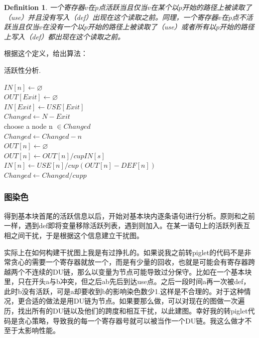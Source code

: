 \documentclass[10pt,a4paper]{article}
\newtheorem{mydef}{Definition}
\begin{document}
\begin{mydef}
    一个寄存器$v$在$p$点活跃当且仅当$v$在某个以$p$开始的路径上被读取了（use）并且没有写入（def）出现在这个读取之前。同理，一个寄存器$v$在$p$点不活跃当且仅当$v$在没有一个以$p$开始的路径上被读取了（use）或者所有以$p$开始的路径上写入（def）都出现在这个读取之前。
\end{mydef}

根据这个定义，给出算法：

\begin{algorithm}
\small
    \caption{活跃性分析. }
    \SetAlgoLined
    \SetAlgoLined
       {
          $IN[n] \leftarrow \varnothing $\\
      }
      $OUT[Exit] \leftarrow \varnothing$\\
      $IN[Exit] \leftarrow USE[Exit]$\\
      $Changed \leftarrow N - {Exit}$\\
      {
      		choose a node n $ \in Changed$ \\
			$Changed \leftarrow Changed - {n}$ \\
			$OUT[n] \leftarrow \varnothing$\\
			 {
          		$OUT[n] \leftarrow OUT[n] /cup IN[s]$\\
      		}
			$IN[n] \leftarrow USE[n] /cup (OUT[n] - DEF[n]) $\\
			{
				 {
          			$Changed \leftarrow Changed /cup {p}$\\
      			}
			}
	  }
    \label{tab:algorithm}
\end{algorithm}

\subsubsection{图染色}

得到基本块首尾的活跃信息以后，开始对基本块内逐条语句进行分析。原则和之前一样，遇到def即将变量移除活跃列表，遇到则加入。在某一语句上的活跃列表互相之间干扰，于是根据这个信息建立干扰图。

实际上在如何构建干扰图上我是有过挣扎的。如果说我之前转piglet的代码不是非常贪心的需要一个寄存器就放一个，而是有少量的回收，也就是可能会有寄存器跨越两个不连续的DU链，那么以变量为节点可能导致过分保守。比如在一个基本块里，只在开头a与b冲突，但之后ab先后到达use点。之后一段时间a再一次被def，此时b没有活跃，可是a却要收到b的影响染色数少1.这样是不合理的。对于这种情况，更合适的做法是用DU链为节点。如果要那么做，可以对现在的图做一次遍历，找出所有的DU链以及他们的跨度和相互干扰，以此建图。幸好我的转piglet代码是贪心策略，导致我的每一个寄存器号就可以被当作一个DU链。我这么做才不至于太影响性能。
\end{document}
